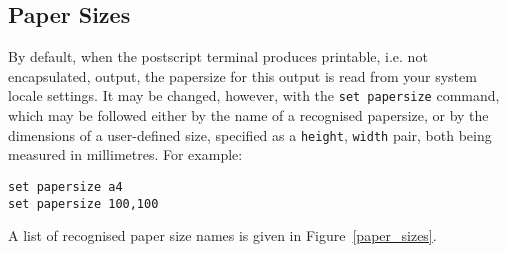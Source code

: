 \documentclass[a4paper,onecolumn,11pt]{book}
\begin{document}
\subsection{Paper Sizes}

By default, when the postscript terminal produces printable, i.e. not
encapsulated, output, the papersize for this output is read from your system
locale settings. It may be changed, however, with the \texttt{set
papersize} command,
which may be followed either by the name of a recognised papersize, or by the
dimensions of a user-defined size, specified as a \texttt{height},
\texttt{width} pair, both being measured in millimetres. For example:

\begin{verbatim}
set papersize a4
set papersize 100,100
\end{verbatim}

A list of recognised paper size names is given in Figure~\ref{paper_sizes}.
\end{document}
